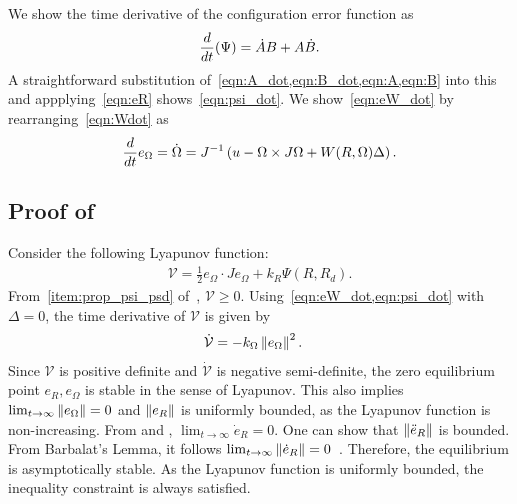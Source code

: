 \documentclass[letterpaper, 10 pt, conference]{ieeeconf}  %
\begin{document}
We show the time derivative of the configuration error function as
\begin{gather*}
	\frac{d }{d t} (\Psi) = \dot{A} B + A \dot{B} .
\end{gather*}
A straightforward substitution of~\cref{eqn:A_dot,eqn:B_dot,eqn:A,eqn:B} into this and appplying~\cref{eqn:eR} shows~\cref{eqn:psi_dot}.
We show~\cref{eqn:eW_dot} by rearranging~\cref{eqn:Wdot} as 
\begin{align*}
	\frac{d }{d t} e_\Omega = \dot{\Omega} = J^{-1} \left( u - \Omega \times J \Omega + W(R,\Omega) \Delta  \right) .
\end{align*}
\subsection{Proof of~}\label{proof:att_control}
Consider the following Lyapunov function:
	\begin{gather}
		\mathcal{V} = \frac{1}{2} e_\Omega \cdot J e_\Omega + k_R \Psi(R,R_d) . \label{eqn:v_nodist}
	\end{gather}
	From~\cref{item:prop_psi_psd} of~, \(\mathcal{V} \geq 0 \).
	Using~\cref{eqn:eW_dot,eqn:psi_dot} with \( \Delta = 0 \), the time derivative of \( \mathcal{V} \) is given by
	\begin{align}
		\dot{\mathcal{V}} &= -k_\Omega \left\| e_\Omega \right\|^2 . \label{eqn:vdot_nodist}
	\end{align}
	Since \( \mathcal{V} \) is positive definite and \( \dot{\mathcal{V}} \) is negative semi-definite, the zero equilibrium point \( e_R, e_\Omega \) is stable in the sense of Lyapunov. This also implies \( \lim_{t\to\infty} \left\| e_\Omega \right\| = 0 \) and \( \left\| e_R \right\| \) is uniformly bounded, as the Lyapunov function is non-increasing. From  and , $\lim_{t\to\infty} \dot e_R =0$. 
	One can show that \( \left\| \ddot{e}_R \right\| \) is bounded.
	From Barbalat's Lemma, it follows \( \lim_{t\to\infty}\left\| \dot{e}_R \right\| = 0 \)~\cite[Lemma 8.2]{khalil1996}. 
	Therefore, the equilibrium is asymptotically stable. 
	As the Lyapunov function is uniformly bounded, the inequality constraint is always satisfied.
	
\end{document}
